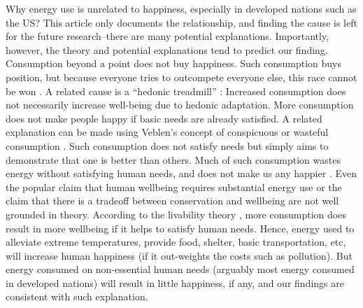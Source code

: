 \documentclass[10pt, letterpaper]{article}
\begin{document}
\begin{spacing}{1.5}
Why energy use is unrelated to happiness, especially in developed nations such
as the US? This article only
documents the relationship, and finding the cause is left for the future
research--there are many potential explanations. Importantly, however, the
theory and potential explanations tend to predict our finding. 
Consumption beyond a point does not buy happiness. Such consumption buys
position, but because everyone tries to outcompete everyone else, this race
cannot be won \citep{frank12,kasser13}. A related cause is a ``hedonic treadmill'' \citep{brickman78cj}:
Increased consumption does not necessarily increase well-being due to
hedonic adaptation. More consumption does not make people happy if basic needs
are already satisfied. %
 A related explanation can be made using Veblen's concept of conspicuous or
 wasteful consumption \citep{veblen05a, veblen05b}. Such consumption does not
 satisfy needs but simply aims to demonstrate that
one is better than others. Much of such consumption wastes energy without
satisfying human needs, %
%
 and  does not make us any happier  \citep{csikszentmihalyi99, frank04, frank05,
   frank12}. %
  Even the popular claim that human wellbeing requires substantial energy use or
 the claim that there is a tradeoff between conservation and wellbeing are not
 well grounded in theory. According to the livability theory
 \citep{veenhoven14b}, more consumption does result in more wellbeing if it
 helps to satisfy human needs. Hence, energy used to alleviate extreme
 temperatures, provide food, shelter, basic transportation, etc, will increase
 human happiness (if it out-weights the costs such as pollution). But energy
 consumed on non-essential human needs (arguably most energy consumed in
 developed nations) will result in little happiness, if any, and our findings
 are consistent with such explanation. 


\end{spacing}
\end{document}
